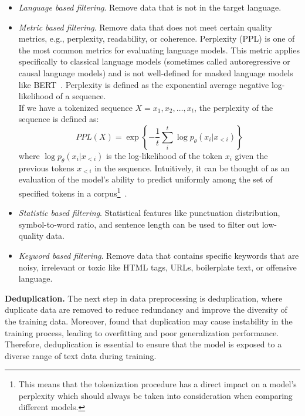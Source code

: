 \begin{itemize}
	\item \textit{Language based filtering}. {Remove data that is not in the target language.}
	\item \textit{Metric based filtering}. {Remove data that does not meet certain quality metrics, e.g., perplexity, readability, or coherence.
	      Perplexity (PPL) is one of the most common metrics for evaluating language models.
	      This metric applies specifically to classical language models (sometimes called autoregressive or causal language models) and is not well-defined for masked language models like BERT~\cite{devlin2019bert}.
	      Perplexity is defined as the exponential average negative log-likelihood of a sequence.\\
	      If we have a tokenized sequence \(X = x_1, x_2, \ldots, x_t\), the perplexity of the sequence is defined as:
	      \begin{equation}
		      PPL(X) = \exp \left\{ -\frac{1}{t} \sum_{i}^{t} \log p_{\theta}(x_i | x_{<i}) \right\}
		      \label{eq:equation_perplexity}
	      \end{equation}
	      where \(\log p_{\theta}(x_i | x_{<i})\) is the log-likelihood of the token \(x_i\) given the previous tokens \(x_{<i}\) in the sequence.
	      Intuitively, it can be thought of as an evaluation of the model’s ability to predict uniformly among the set of specified tokens in a corpus\footnote{This means that the tokenization procedure has a direct impact on a model’s perplexity which should always be taken into consideration when comparing different models.}~\cite{huggingface2023perplexity}.
	      }
	\item \textit{Statistic based filtering}. {Statistical features like punctuation distribution, symbol-to-word ratio, and sentence length can be used to filter out low-quality data.
	      }
	\item \textit{Keyword based filtering}. {Remove data that contains specific keywords that are noisy, irrelevant or toxic like HTML tags, URLs, boilerplate text, or offensive language.}
\end{itemize}

\textbf{Deduplication.}
The next step in data preprocessing is deduplication, where duplicate data  are removed to reduce redundancy and improve the diversity of the training data.
Moreover, \textcite{hernandez2022scaling} found that duplication may cause instability in the training process, leading to overfitting and poor generalization performance.
Therefore, deduplication is essential to ensure that the model is exposed to a diverse range of text data during training.

